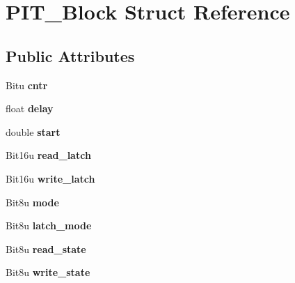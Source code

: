 \hypertarget{structPIT__Block}{\section{P\-I\-T\-\_\-\-Block Struct Reference}
\label{structPIT__Block}
}
\subsection*{Public Attributes}
\begin{DoxyCompactItemize}
\item 
\hypertarget{structPIT__Block_a1ea94b199c88ea7452f8070380eb128a}{Bitu {\bfseries cntr}}\label{structPIT__Block_a1ea94b199c88ea7452f8070380eb128a}

\item 
\hypertarget{structPIT__Block_af79a7a51e83279cd33fbea3930d2c5bf}{float {\bfseries delay}}\label{structPIT__Block_af79a7a51e83279cd33fbea3930d2c5bf}

\item 
\hypertarget{structPIT__Block_a93d19f60a1048bef358d12186638cd9f}{double {\bfseries start}}\label{structPIT__Block_a93d19f60a1048bef358d12186638cd9f}

\item 
\hypertarget{structPIT__Block_a2abd4ed2d9e059cc3b1e2cecc91c08cb}{Bit16u {\bfseries read\-\_\-latch}}\label{structPIT__Block_a2abd4ed2d9e059cc3b1e2cecc91c08cb}

\item 
\hypertarget{structPIT__Block_a0455eb677f1e6cb4181ffb0b6f996ddd}{Bit16u {\bfseries write\-\_\-latch}}\label{structPIT__Block_a0455eb677f1e6cb4181ffb0b6f996ddd}

\item 
\hypertarget{structPIT__Block_a0b50f48a41754f0dd9c749b8dcf94e5b}{Bit8u {\bfseries mode}}\label{structPIT__Block_a0b50f48a41754f0dd9c749b8dcf94e5b}

\item 
\hypertarget{structPIT__Block_ae4000451e3f1ebf7d30f4bf013464fc6}{Bit8u {\bfseries latch\-\_\-mode}}\label{structPIT__Block_ae4000451e3f1ebf7d30f4bf013464fc6}

\item 
\hypertarget{structPIT__Block_a4405786e185a16e63189f3ef4dde33a2}{Bit8u {\bfseries read\-\_\-state}}\label{structPIT__Block_a4405786e185a16e63189f3ef4dde33a2}

\item 
\hypertarget{structPIT__Block_a894dfe5c8eba5286ecb0bbbcaf9d2059}{Bit8u {\bfseries write\-\_\-state}}\label{structPIT__Block_a894dfe5c8eba5286ecb0bbbcaf9d2059}


\end{DoxyCompactItemize}
